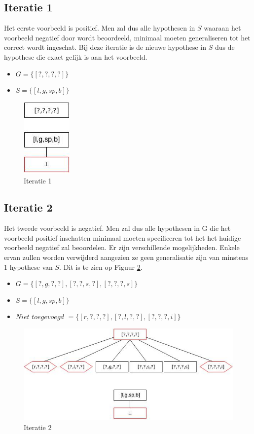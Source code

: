 \documentclass{article}
\begin{document}
\newpage

\subsection{Iteratie 1}
Het eerste voorbeeld is positief. Men zal dus alle hypothesen in $S$ waaraan het voorbeeld negatief door wordt beoordeeld, minimaal moeten generaliseren tot het correct wordt ingeschat. Bij deze iteratie is de nieuwe hypothese in $S$ dus de hypothese die exact gelijk is aan het voorbeeld.

\begin{itemize}
\item $G = \{[?,?,?,?]\}$
\item $S = \{[l,g,sp,b]\}$
\end{itemize}

\begin{figure}[H]
\centering
\caption{Iteratie 1}
\label{iteratie1}
\includegraphics[scale=0.5]{iteration_graphs/iteration1.jpg}
\end{figure}

\subsection{Iteratie 2}
Het tweede voorbeeld is negatief. Men zal dus alle hypothesen in G die het voorbeeld positief inschatten minimaal moeten specificeren tot het het huidige voorbeeld negatief zal beoordelen. Er zijn verschillende mogelijkheden. Enkele ervan zullen worden verwijderd aangezien ze geen generalisatie zijn van minstens 1 hypothese van $S$. Dit is te zien op Figuur \ref{iteratie2}.

\begin{itemize}
\item $G = \{[?,g,?,?],[?,?,s,?],[?,?,?,s]\}$
\item $S = \{[l,g,sp,b]\}$
\item $Niet$ $toegevoegd$ $= \{[r,?,?,?],[?,l,?,?],[?,?,?,i]\}$
\end{itemize}

\begin{figure}[H]
\centering
\caption{Iteratie 2}
\label{iteratie2}
\includegraphics[scale=0.5]{iteration_graphs/iteration2.jpg}
\end{figure}
\end{document}
